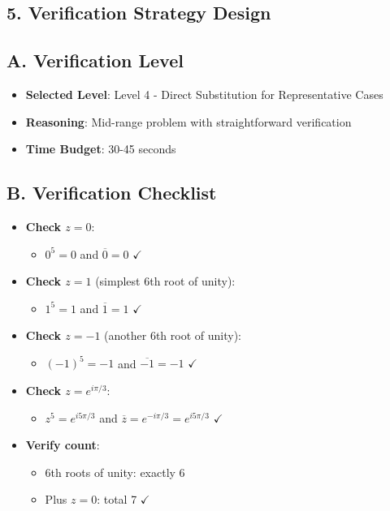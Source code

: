 \documentclass[11pt]{article}
\begin{document}
\begin{verificationbox}
\section*{5. Verification Strategy Design}

\subsection*{A. Verification Level}
\begin{itemize}[leftmargin=*]
    \item \textbf{Selected Level}: Level 4 - Direct Substitution for Representative Cases
    \item \textbf{Reasoning}: Mid-range problem with straightforward verification
    \item \textbf{Time Budget}: 30-45 seconds
\end{itemize}

\subsection*{B. Verification Checklist}
\begin{itemize}[leftmargin=*]
    \item \textbf{Check $z = 0$}:
    \begin{itemize}
        \item $0^5 = 0$ and $\overline{0} = 0$ $\checkmark$
    \end{itemize}
    \item \textbf{Check $z = 1$} (simplest 6th root of unity):
    \begin{itemize}
        \item $1^5 = 1$ and $\overline{1} = 1$ $\checkmark$
    \end{itemize}
    \item \textbf{Check $z = -1$} (another 6th root of unity):
    \begin{itemize}
        \item $(-1)^5 = -1$ and $\overline{-1} = -1$ $\checkmark$
    \end{itemize}
    \item \textbf{Check $z = e^{i\pi/3}$}:
    \begin{itemize}
        \item $z^5 = e^{i5\pi/3}$ and $\overline{z} = e^{-i\pi/3} = e^{i5\pi/3}$ $\checkmark$
    \end{itemize}
    \item \textbf{Verify count}:
    \begin{itemize}
        \item 6th roots of unity: exactly 6
        \item Plus $z = 0$: total 7 $\checkmark$
    \end{itemize}
\end{itemize}


\end{verificationbox}
\end{document}
